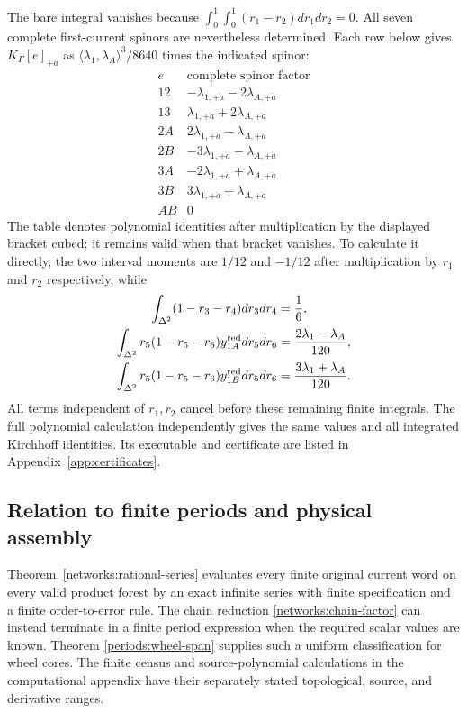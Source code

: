 The bare integral vanishes because $\int_0^1\int_0^1(r_1-r_2)dr_1dr_2=0$.
All seven complete first-current spinors are nevertheless determined.
Each row below gives $K_\Gamma[e]_{+\dot a}$ as
$\langle\lambda_1,\lambda_A\rangle^3/8640$ times the indicated spinor:
\begin{equation}
 \begin{array}{c|c}
 e & \text{complete spinor factor}\\
 \hline
 12&-\lambda_{1,+\dot a}-2\lambda_{A,+\dot a}\\
 13&\lambda_{1,+\dot a}+2\lambda_{A,+\dot a}\\
 2A&2\lambda_{1,+\dot a}-\lambda_{A,+\dot a}\\
 2B&-3\lambda_{1,+\dot a}-\lambda_{A,+\dot a}\\
 3A&-2\lambda_{1,+\dot a}+\lambda_{A,+\dot a}\\
 3B&3\lambda_{1,+\dot a}+\lambda_{A,+\dot a}\\
 AB&0
 \end{array}
 \label{networks:fork-values}
\end{equation}
The table denotes polynomial identities after multiplication by the
displayed bracket cubed; it remains valid when that bracket vanishes.
To calculate it directly, the two interval moments are $1/12$ and
$-1/12$ after multiplication by $r_1$ and $r_2$ respectively, while
\begin{align}
 \int_{\Delta^2}(1-r_3-r_4)dr_3dr_4&=\frac16,\\
 \int_{\Delta^2}r_5(1-r_5-r_6)y_{1A}^{\rm red}dr_5dr_6
                           &=\frac{2\lambda_1-\lambda_A}{120},\\
 \int_{\Delta^2}r_5(1-r_5-r_6)y_{1B}^{\rm red}dr_5dr_6
                           &=\frac{3\lambda_1+\lambda_A}{120}.
 \label{networks:fork-factorized-moments}
\end{align}
All terms independent of $r_1,r_2$ cancel before these remaining finite
integrals.  The full polynomial calculation independently gives the same
values and all integrated Kirchhoff identities.  Its executable and
certificate are listed in Appendix~\ref{app:certificates}.

\subsection{Relation to finite periods and physical assembly}
\label{networks:scope}

Theorem~\ref{networks:rational-series} evaluates every finite original
current word on every valid product forest by an exact infinite series
with finite specification and a finite order-to-error rule.  The chain
reduction \eqref{networks:chain-factor} can instead terminate in a finite
period expression when the required scalar values are known.  Theorem
\ref{periods:wheel-span} supplies such a uniform classification for wheel
cores.  The finite census and source-polynomial calculations in the
computational appendix have their separately stated topological, source,
and derivative ranges.

